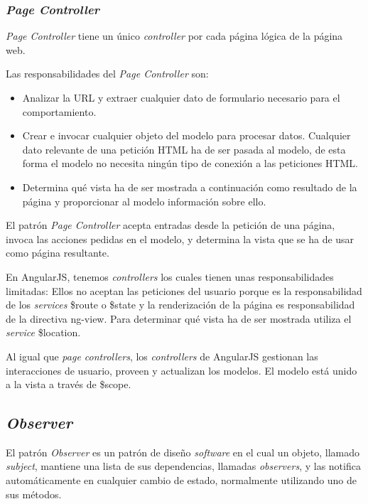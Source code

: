 \subsubsection{\textit{Page Controller}}
\textit{Page Controller} tiene un único \textit{controller} por cada página lógica de la página web\cite{martinfowler2002}.


Las responsabilidades del \textit{Page Controller} son:


\begin{itemize}
\item Analizar la URL y extraer cualquier dato de formulario necesario para el comportamiento.
\item Crear e invocar cualquier objeto del modelo para procesar datos. Cualquier dato relevante de una petición HTML ha de ser pasada al modelo, de esta forma el modelo no necesita ningún tipo de conexión a las peticiones HTML.
\item Determina qué vista ha de ser mostrada a continuación como resultado de la página y proporcionar al modelo información sobre ello.
\end{itemize}


El patrón \textit{Page Controller} acepta entradas desde la petición de una página, invoca las acciones pedidas en el modelo, y determina la vista que se ha de usar como página resultante\cite{page_controller_microsoft}.


En AngularJS, tenemos \textit{controllers} los cuales tienen unas responsabilidades limitadas: Ellos no aceptan las peticiones del usuario porque es la responsabilidad de los \textit{services} \$route o \$state y la renderización de la página es responsabilidad de la directiva ng-view. Para determinar qué vista ha de ser mostrada utiliza el \textit{service} \$location.


Al igual que \textit{page controllers}, los \textit{controllers} de AngularJS gestionan las interacciones de usuario, proveen y actualizan los modelos. El modelo está unido a la vista a través de \$scope\cite{mgechev}.


\subsection{	\textit{Observer}}
El patrón \textit{Observer} es un patrón de diseño \textit{software} en el cual un objeto, llamado \textit{subject}, mantiene una lista de sus dependencias, llamadas \textit{observers}, y las notifica automáticamente en cualquier cambio de estado, normalmente utilizando uno de sus métodos. 


